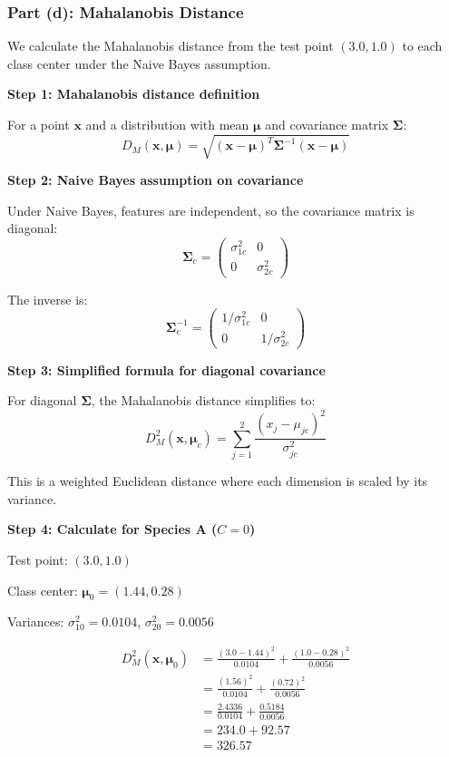 \documentclass[12pt]{article}
\begin{document}
\subsubsection{Part (d): Mahalanobis Distance}

\begin{solution}
We calculate the Mahalanobis distance from the test point $(3.0, 1.0)$ to each class center under the Naive Bayes assumption.

\textbf{Step 1: Mahalanobis distance definition}

For a point $\mathbf{x}$ and a distribution with mean $\boldsymbol{\mu}$ and covariance matrix $\boldsymbol{\Sigma}$:
\[
D_M(\mathbf{x}, \boldsymbol{\mu}) = \sqrt{(\mathbf{x} - \boldsymbol{\mu})^T \boldsymbol{\Sigma}^{-1} (\mathbf{x} - \boldsymbol{\mu})}
\]

\textbf{Step 2: Naive Bayes assumption on covariance}

Under Naive Bayes, features are independent, so the covariance matrix is diagonal:
\[
\boldsymbol{\Sigma}_c = \begin{pmatrix}
\sigma_{1c}^2 & 0 \\
0 & \sigma_{2c}^2
\end{pmatrix}
\]

The inverse is:
\[
\boldsymbol{\Sigma}_c^{-1} = \begin{pmatrix}
1/\sigma_{1c}^2 & 0 \\
0 & 1/\sigma_{2c}^2
\end{pmatrix}
\]

\textbf{Step 3: Simplified formula for diagonal covariance}

For diagonal $\boldsymbol{\Sigma}$, the Mahalanobis distance simplifies to:
\[
D_M^2(\mathbf{x}, \boldsymbol{\mu}_c) = \sum_{j=1}^{2} \frac{(x_j - \mu_{jc})^2}{\sigma_{jc}^2}
\]

This is a weighted Euclidean distance where each dimension is scaled by its variance.

\textbf{Step 4: Calculate for Species A ($C = 0$)}

Test point: $(3.0, 1.0)$

Class center: $\boldsymbol{\mu}_0 = (1.44, 0.28)$

Variances: $\sigma_{10}^2 = 0.0104$, $\sigma_{20}^2 = 0.0056$

\begin{align}
D_M^2(\mathbf{x}, \boldsymbol{\mu}_0) &= \frac{(3.0 - 1.44)^2}{0.0104} + \frac{(1.0 - 0.28)^2}{0.0056} \\
&= \frac{(1.56)^2}{0.0104} + \frac{(0.72)^2}{0.0056} \\
&= \frac{2.4336}{0.0104} + \frac{0.5184}{0.0056} \\
&= 234.0 + 92.57 \\
&= 326.57
\end{align}


\end{solution}
\end{document}
